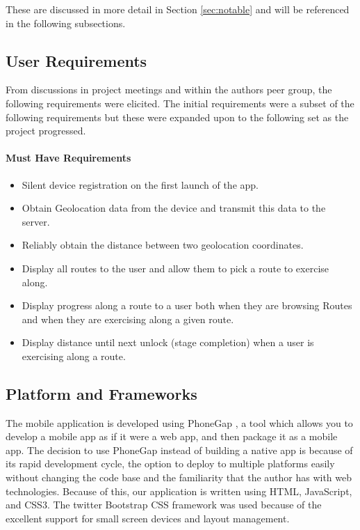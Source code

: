 These are discussed in more detail in Section \ref{sec:notable} and
will be referenced in the following subsections.

\subsection{User Requirements}
From discussions in project meetings and within the authors peer
group, the following requirements were elicited. The initial
requirements were a subset of the following requirements but these
were expanded upon to the following set as the project progressed.
\paragraph{Must Have Requirements}
\begin{itemize}
\item Silent device registration on the first launch of the app.
\item Obtain Geolocation data from the device and transmit this data
  to the server.
\item Reliably obtain the distance between two geolocation
  coordinates. 
\item Display all routes to the user and allow them to pick a route to
  exercise along.
\item Display progress along a route to a user both when they are
  browsing Routes and when they are exercising along a given route.
\item Display distance until next unlock (stage completion) when a
  user is exercising along a route.
\end{itemize} 


\subsection{Platform and Frameworks}
The mobile application is developed using PhoneGap \cite{phonegap}, 
a tool which allows you to develop a mobile app as if it were
a web app, and then package it as a mobile app. The decision to use
PhoneGap instead of building a native app is because of its rapid
development cycle, the option to deploy to multiple platforms easily
without changing the code base and the familiarity that the author has
with web technologies. Because of this, our application is written
using HTML, JavaScript, and CSS3. The twitter Bootstrap CSS framework
\cite{bootstrap} was used because of the excellent support for small
screen devices and layout management. 

